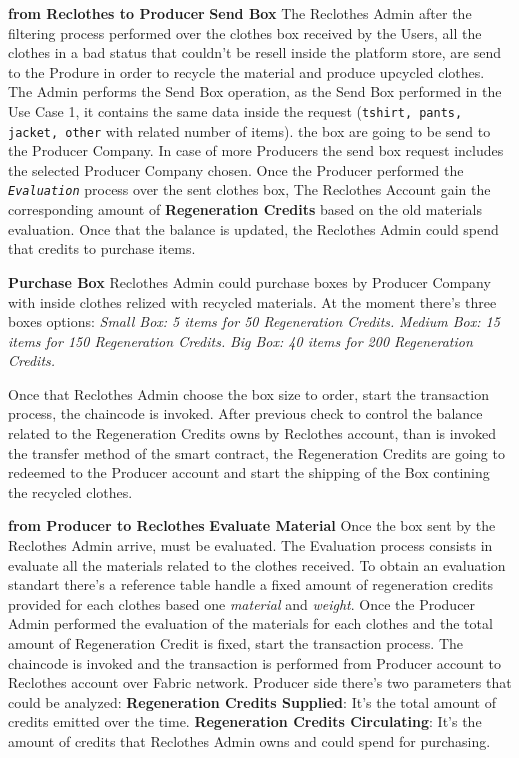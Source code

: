 \begin{outline}[enumerate]
    \1 \textbf{from Reclothes to Producer}   
    \2 \textbf{Send Box}
    \3 The Reclothes Admin after the filtering process performed over the clothes box
    received by the Users, all the clothes in a bad status that couldn't be resell inside the 
    platform store, are send to the Produre in order to recycle the material and produce
    upcycled clothes. The Admin performs the Send Box operation, as the Send Box performed in the Use Case 1,
    it contains the same data inside the request (\texttt{tshirt, pants, jacket, other} with related number of items).
    the box are going to be send to the Producer Company. In case of more Producers the send box request 
    includes the selected Producer Company chosen.
    \3 Once the Producer performed the \textit{\texttt{Evaluation}} process over the sent clothes box, 
    The Reclothes Account gain the corresponding amount of \textbf{Regeneration Credits} based on the 
    old materials evaluation. Once that the balance is updated, the Reclothes Admin could spend that 
    credits to purchase items. 
    
    \2 \textbf{Purchase Box}
    \3 Reclothes Admin could purchase boxes by Producer Company with inside clothes relized with recycled 
    materials. At the moment there's three boxes options: 
    \4 \textit{Small Box: 5 items for 50 Regeneration Credits.}
    \4 \textit{Medium Box: 15 items for 150 Regeneration Credits.} 
    \4 \textit{Big Box: 40 items for 200 Regeneration Credits.}

    Once that Reclothes Admin choose the box size to order, start the transaction process, the chaincode
    is invoked. After previous check to control the balance related to the Regeneration Credits owns
    by Reclothes account, than is invoked the transfer method of the smart contract, the Regeneration
    Credits are going to redeemed to the Producer account and start the shipping of the Box contining
    the recycled clothes.       

    \1 \textbf{from Producer to Reclothes}
    \2 \textbf{Evaluate Material}
    \3 Once the box sent by the Reclothes Admin arrive, must be evaluated. The Evaluation process
    consists in evaluate all the materials related to the clothes received. To obtain an evaluation
    standart there's a reference table handle a fixed amount of regeneration credits provided for
    each clothes based one \textit{material} and \textit{weight}. Once the Producer Admin performed 
    the evaluation of the materials for each clothes and the total amount of Regeneration Credit is fixed,
    start the transaction process. The chaincode is invoked and the transaction is performed from Producer account
    to Reclothes account over Fabric network. Producer side there's two parameters that could be 
    analyzed:
    \4 \textbf{Regeneration Credits Supplied}: It's the total amount of credits emitted over the time.
    \4 \textbf{Regeneration Credits Circulating}: It's the amount of credits that Reclothes Admin
    owns and could spend for purchasing. 
\end{outline}


